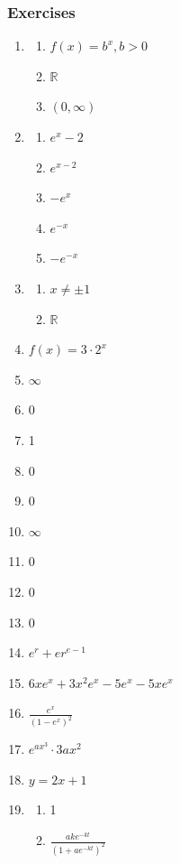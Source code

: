 \documentclass{article} \usepackage[margin=1in]{geometry}
\begin{document}
\subsubsection*{Exercises}
\begin{enumerate}
	\item \begin{enumerate}
		      \item$f(x)=b^x,b>0$
		      \item $\mathbb{R}$
		      \item $(0,\infty)$
	      \end{enumerate}
	      \setcounter{enumi}{12}
	\item \begin{enumerate}
		      \item $e^x-2$
		      \item $e^{x-2}$
		      \item $-e^x$
		      \item $e^{-x}$
		      \item $-e^{-x}$
	      \end{enumerate}
	      \setcounter{enumi}{14}
	\item \begin{enumerate}
		      \item $x\ne\pm1$
		      \item $\mathbb{R}$
	      \end{enumerate}
	      \setcounter{enumi}{16}
	\item $f(x)=3\cdot2^x$
	      \setcounter{enumi}{22}
	\item $\infty$
	\item 0
	\item 1
	\item 0
	\item 0
	\item $\infty$
	\item 0
	\item 0
	\item 0
	\item $e^r+er^{e-1}$
	\item $6xe^x+3x^2e^x-5e^x-5xe^x$
	\item $\frac{e^x}{(1-e^x)^2}$
	\item $e^{ax^3}\cdot3ax^2$
	      \setcounter{enumi}{50}
	\item $y=2x+1$
	      \setcounter{enumi}{64}
	\item \begin{enumerate}
		      \item 1
		      \item $\frac{ake^{-kt}}{(1+ae^{-kt})^2}$

\end{enumerate}
\end{enumerate}
\end{document}
